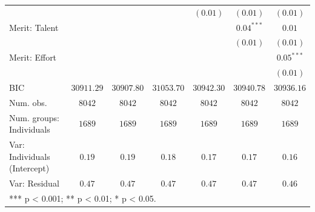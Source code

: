 \documentclass[
  12pt,
  a4paper,
]{article}
\begin{document}
\begin{table}[!ht]
\begin{center}
{\begin{tabular}{l c c c c c c}
                                    &               &               &               & $(0.01)$      & $(0.01)$      & $(0.01)$      \\
Merit: Talent                       &               &               &               &               & $0.04^{***}$  & $0.01$        \\
                                    &               &               &               &               & $(0.01)$      & $(0.01)$      \\
Merit: Effort                       &               &               &               &               &               & $0.05^{***}$  \\
                                    &               &               &               &               &               & $(0.01)$      \\
\hline
BIC                                 & $30911.29$    & $30907.80$    & $31053.70$    & $30942.30$    & $30940.78$    & $30936.16$    \\
Num. obs.                           & $8042$        & $8042$        & $8042$        & $8042$        & $8042$        & $8042$        \\
Num. groups: Individuals            & $1689$        & $1689$        & $1689$        & $1689$        & $1689$        & $1689$        \\
Var: Individuals (Intercept)        & $0.19$        & $0.19$        & $0.18$        & $0.17$        & $0.17$        & $0.16$        \\
Var: Residual                       & $0.47$        & $0.47$        & $0.47$        & $0.47$        & $0.47$        & $0.46$        \\
\hline
\multicolumn{7}{l}{\scriptsize{*** p < 0.001; ** p < 0.01; * p < 0.05.}}
\end{tabular}
}
\label{table:coefficients}
\end{center}
\end{table}
\end{document}
